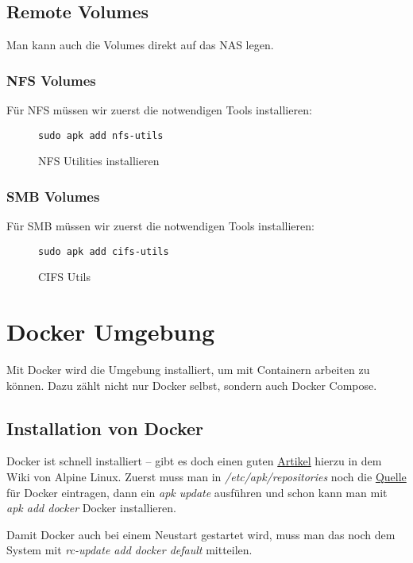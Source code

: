 \documentclass[12pt,a4paper,ngerman]{article}
\newcommand{\code}[1]{\textit{#1}}
\newcommand{\jpacaption}[1]{\caption{#1}\label{fig:#1}}
\begin{document}
\subsection{Remote Volumes}
Man kann auch die Volumes direkt auf das NAS legen.

\subsubsection{NFS Volumes}
Für NFS müssen wir zuerst die notwendigen Tools installieren:

\begin{figure}[H]
    \begin{lstlisting}
sudo apk add nfs-utils
    \end{lstlisting}
    \jpacaption{NFS Utilities installieren}
\end{figure}

\subsubsection{SMB Volumes}
Für SMB müssen wir zuerst die notwendigen Tools installieren:

\begin{figure}[H]
    \begin{lstlisting}
sudo apk add cifs-utils
    \end{lstlisting}
    \jpacaption{CIFS Utils}
\end{figure}

\section{Docker Umgebung}
Mit Docker wird die Umgebung installiert, um mit Containern arbeiten zu können.
Dazu zählt nicht nur Docker selbst, sondern auch Docker Compose.

\subsection{Installation von Docker}
Docker ist schnell installiert -- gibt es doch einen guten
\href{https://wiki.alpinelinux.org/wiki/Docker}{Artikel} hierzu in dem Wiki von
Alpine Linux. Zuerst muss man in \code{/etc/apk/repositories} noch die
\href{http://dl-cdn.alpinelinux.org/alpine/latest-stable/community}{Quelle} für
Docker eintragen, dann ein \code{apk update} ausführen und schon kann man mit
\code{apk add docker} Docker installieren.

Damit Docker auch bei einem Neustart gestartet wird, muss man das noch dem
System mit \code{rc-update add docker default} mitteilen.
\end{document}
